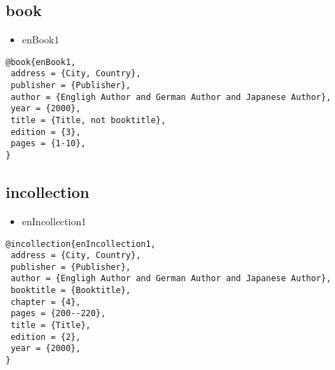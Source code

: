 \documentclass[9pt, twocolumn, a4paper]{jsarticle}
\begin{document}
\begin{bibunit}[IEEJtran]
\subsection{book}

\begin{itemize}
  \item enBook1 \cite{enBook1}
\end{itemize}

\begin{lstlisting}
@book{enBook1,
 address = {City, Country},
 publisher = {Publisher},
 author = {Engligh Author and German Author and Japanese Author},
 year = {2000},
 title = {Title, not booktitle},
 edition = {3},
 pages = {1-10},
}
\end{lstlisting}

\subsection{incollection}

\begin{itemize}
  \item enIncollection1 \cite{enIncollection1}
\end{itemize}

\begin{lstlisting}
@incollection{enIncollection1,
 address = {City, Country},
 publisher = {Publisher},
 author = {Engligh Author and German Author and Japanese Author},
 booktitle = {Booktitle},
 chapter = {4},
 pages = {200--220},
 title = {Title},
 edition = {2},
 year = {2000},
}
\end{lstlisting}

{\footnotesize \putbib[samplebib]}
\end{bibunit}

\clearpage
\end{document}
